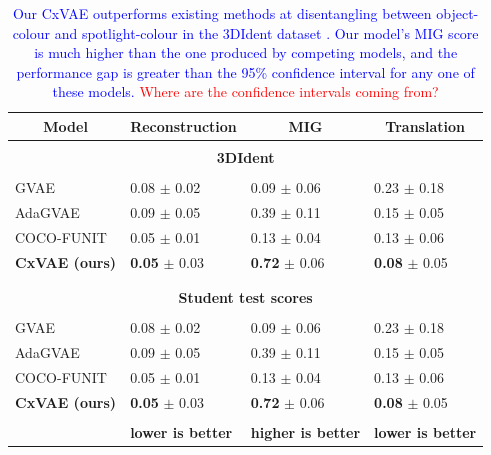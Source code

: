 \documentclass{article} %
\newcommand{\change}[1]{\textcolor{blue}{#1}}
\newcommand{\todo}[1]{\textcolor{red}{#1}}
\begin{document}
\begin{table}[t]
\caption{\change{Our CxVAE outperforms existing methods at disentangling between object-colour and spotlight-colour in the 3DIdent dataset \citep{Zimmerman2021Contrastive}. Our model's MIG score is much higher than the one produced by competing models, and the performance gap is greater than the 95\% confidence interval for any one of these models.} \todo{Where are the confidence intervals coming from?}}
\label{table:results}
\begin{center}
\begin{tabular}{llll}
\multicolumn{1}{c}{\sc Model}  & \multicolumn{1}{c}{\sc Reconstruction} & \multicolumn{1}{c}{\sc MIG} & \multicolumn{1}{c}{\sc Translation}
\\ \hline \\
\multicolumn{4}{c}{\bf 3DIdent \citep{Zimmerman2021Contrastive}} \\
\hline \\
GVAE \citep{Hosoya2019GroupbasedLO} & 0.08 $\pm$ 0.02 & 0.09 $\pm$ 0.06 & 0.23 $\pm$ 0.18 \\
AdaGVAE \citep{Locatello2020WeaklySupervisedDW} & 0.09 $\pm$ 0.05 & 0.39 $\pm$ 0.11 & 0.15 $\pm$ 0.05\\ 
COCO-FUNIT \citep{Saito2020Coco} & 0.05 $\pm$ 0.01 & 0.13 $\pm$ 0.04 & 0.13 $\pm$ 0.06\\
\textbf{CxVAE (ours)} & \textbf{0.05} $\pm$ 0.03 & \textbf{0.72} $\pm$ 0.06 & \textbf{0.08} $\pm$ 0.05\\
\\ \hline \\
\multicolumn{4}{c}{\bf Student test scores} \\
\hline \\
GVAE \citep{Hosoya2019GroupbasedLO} & 0.08 $\pm$ 0.02 & 0.09 $\pm$ 0.06 & 0.23 $\pm$ 0.18 \\
AdaGVAE \citep{Locatello2020WeaklySupervisedDW} & 0.09 $\pm$ 0.05 & 0.39 $\pm$ 0.11 & 0.15 $\pm$ 0.05\\ 
COCO-FUNIT \citep{Saito2020Coco} & 0.05 $\pm$ 0.01 & 0.13 $\pm$ 0.04 & 0.13 $\pm$ 0.06\\
\textbf{CxVAE (ours)} & \textbf{0.05} $\pm$ 0.03 & \textbf{0.72} $\pm$ 0.06 & \textbf{0.08} $\pm$ 0.05\\
\\ \hline
& \bf lower is better & \bf higher is better & \bf lower is better \\
\hline
\end{tabular}
\end{center}
\end{table}
\end{document}
